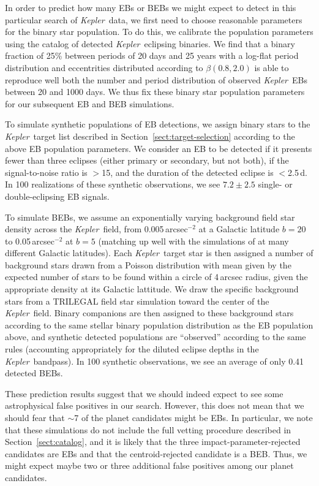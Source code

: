 \documentclass[manuscript, letterpaper]{aastex6}
\newcommand{\project}[1]{\textsl{#1}}
\newcommand{\kepler}{\project{Kepler}}
\newcommand{\sectionname}{Section}
\newcommand{\sectref}[1]{\ref{sect:#1}}
\newcommand{\Sect}[1]{\sectionname~\sectref{#1}}
\newcommand{\sect}[1]{\Sect{#1}}
\begin{document}
In order to predict how many EBs or BEBs we might expect to detect in this
particular search of \kepler\ data, we first need to choose reasonable parameters
for the binary star population.  To do this, we calibrate the population
parameters using the catalog of detected \kepler\ eclipsing binaries.  We
find that a binary fraction of 25\% between periods of 20 days and 25 years with
a log-flat period distribution and eccentrities distributed according
to $\beta(0.8, 2.0)$ is able to reproduce well both the number and period
distribution of observed \kepler\ EBs between 20 and 1000 days.  We thus fix these
binary star population parameters for our subsequent EB and BEB simulations.

To simulate synthetic populations of EB detections, we assign binary stars  to
the \kepler\ target list described in \sect{target-selection} according to the
above EB population parameters.  We consider an EB to be detected if it
presents fewer than three eclipses (either primary or secondary, but not
both), if the signal-to-noise ratio is $>$15, and the duration of the
detected eclipse is $<$2.5\,d.  In 100 realizations of these synthetic
observations, we see $7.2 \pm 2.5$ single- or double-eclipsing EB signals.

To simulate BEBs, we assume an exponentially varying background field star
density across the \kepler\ field, from 0.005\,arcsec$^{-2}$ at a Galactic
latitude $b=20$ to 0.05\,arcsec$^{-2}$ at $b=5$ (matching up well with the
simulations of \citet{Morton:2011} at many different Galactic latitudes). Each
\kepler\ target star is then assigned a number of background stars drawn from
a Poisson distribution with mean given by the expected number of stars to be
found within a circle of 4\,arcsec radius, given the  appropriate density at
its Galactic lattitude.   We draw the specific background stars from a
TRILEGAL \citep{Girardi:2005}  field star simulation toward the center of the
\kepler\ field.  Binary companions are then assigned to these background stars
according to the same stellar binary population distribution as the EB
population above, and synthetic detected populations  are ``observed''
according to the same rules (accounting appropriately for the diluted eclipse
depths in the \kepler\ bandpass).  In 100 synthetic observations, we see an
average of only 0.41 detected BEBs.

These prediction results suggest that we should indeed expect to see some
astrophysical false positives in our search.  However, this does not mean that  we
should fear that $\sim$7 of the planet candidates might be EBs. In particular,
we note that these simulations do not include the full vetting procedure
described in \sect{catalog}, and it is likely that the three impact-parameter-rejected
candidates are EBs and that the centroid-rejected candidate is a BEB.  Thus,
we might expect maybe two or three additional false positives among our planet
candidates.
\end{document}
